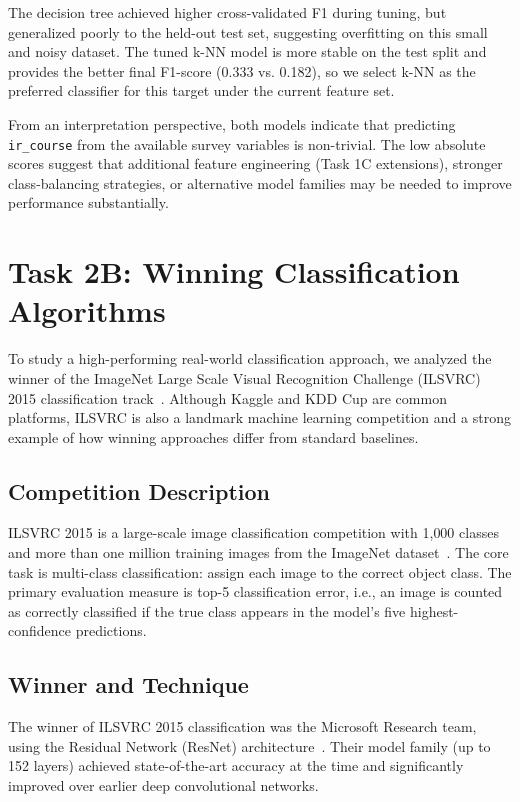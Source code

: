 \documentclass[runningheads]{llncs}
\begin{document}
The decision tree achieved higher cross-validated F1 during tuning, but generalized poorly to the held-out test set, suggesting overfitting on this small and noisy dataset. The tuned k-NN model is more stable on the test split and provides the better final F1-score (0.333 vs.
0.182), so we select k-NN as the preferred classifier for this target under the current feature set.

From an interpretation perspective, both models indicate that predicting \texttt{ir\_course} from the available survey variables is non-trivial. The low absolute scores suggest that additional feature engineering (Task 1C extensions), stronger class-balancing strategies, or alternative model families may be needed to improve performance substantially.

\section{Task 2B: Winning Classification Algorithms}
To study a high-performing real-world classification approach, we analyzed the winner of the ImageNet Large Scale Visual Recognition Challenge (ILSVRC) 2015 classification track~\cite{russakovsky_2015}. Although Kaggle and KDD Cup are common platforms, ILSVRC is also a landmark machine learning competition and a strong example of how winning approaches differ from standard baselines.

\subsection*{Competition Description}
ILSVRC 2015 is a large-scale image classification competition with 1{,}000 classes and more than one million training images from the ImageNet dataset~\cite{russakovsky_2015}. The core task is multi-class classification: assign each image to the correct object class. The primary evaluation measure is top-5 classification error, i.e., an image is counted as correctly classified if the true class appears in the model's five highest-confidence predictions.

\subsection*{Winner and Technique}
The winner of ILSVRC 2015 classification was the Microsoft Research team, using the Residual Network (ResNet) architecture~\cite{he_2016}. Their model family (up to 152 layers) achieved state-of-the-art accuracy at the time and significantly improved over earlier deep convolutional networks.
\end{document}
